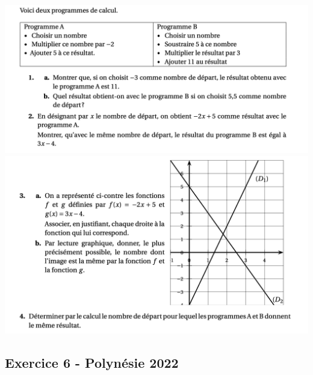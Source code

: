 \documentclass[14 pt, fleqn]{extarticle}
\theoremstyle{plain}
\begin{document}
\includegraphics[width = 21 cm]{Ex51}
\includegraphics[width = 21 cm]{Ex52}


\subsection*{Exercice 6 - Polynésie 2022}	
\end{document}
